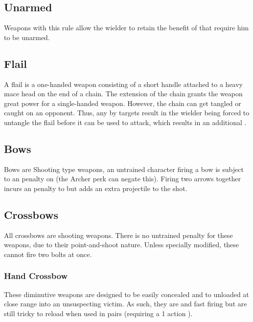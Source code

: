 \subsection{Unarmed}
Weapons with this rule allow the wielder to retain the benefit of  that require him to be unarmed.

\subsection{Flail}
A flail is a one-handed weapon consisting of a short handle attached to a heavy mace head on the end of a chain. The extension of the chain grants the weapon great power for a single-handed weapon. However, the chain can get tangled or caught on an opponent. Thus, any   by targets result in the wielder being forced to untangle the flail before it can be used to attack, which results in an additional . 

\subsection{Bows}
Bows are Shooting type weapons, an untrained character firing a bow is subject to an  penalty on  (the Archer perk can negate this). Firing two arrows together incurs an  penalty to  but adds an extra projectile to the shot.


\subsection{Crossbows}
All crossbows are shooting weapons. There is no untrained penalty for these weapons, due to their point-and-shoot nature. Unless specially modified, these cannot fire two bolts at once.

\subsubsection{Hand Crossbow}
These diminutive weapons are designed to be easily concealed and to unloaded at close range into an unsuspecting victim. As such, they are  and fast firing but are still tricky to reload when used in pairs (requiring a 1 action ).

